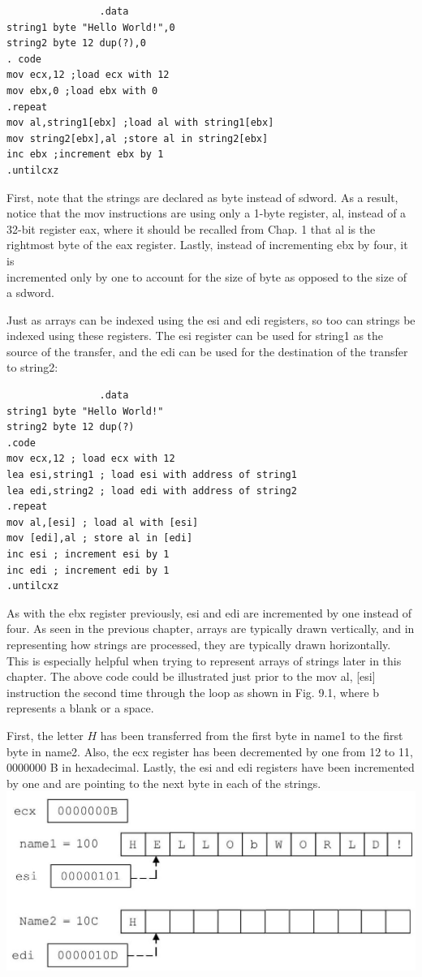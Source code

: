 \documentclass[10pt]{article}
\begin{document}
\begin{verbatim}
                .data
string1 byte "Hello World!",0
string2 byte 12 dup(?),0
. code
mov ecx,12 ;load ecx with 12
mov ebx,0 ;load ebx with 0
.repeat
mov al,string1[ebx] ;load al with string1[ebx]
mov string2[ebx],al ;store al in string2[ebx]
inc ebx ;increment ebx by 1
.untilcxz
\end{verbatim}

First, note that the strings are declared as byte instead of sdword. As a result, notice that the mov instructions are using only a 1-byte register, al, instead of a 32-bit register eax, where it should be recalled from Chap. 1 that al is the rightmost byte of the eax register. Lastly, instead of incrementing ebx by four, it is\\
incremented only by one to account for the size of byte as opposed to the size of a sdword.

Just as arrays can be indexed using the esi and edi registers, so too can strings be indexed using these registers. The esi register can be used for string1 as the source of the transfer, and the edi can be used for the destination of the transfer to string2:

\begin{verbatim}
                .data
string1 byte "Hello World!"
string2 byte 12 dup(?)
.code
mov ecx,12 ; load ecx with 12
lea esi,string1 ; load esi with address of string1
lea edi,string2 ; load edi with address of string2
.repeat
mov al,[esi] ; load al with [esi]
mov [edi],al ; store al in [edi]
inc esi ; increment esi by 1
inc edi ; increment edi by 1
.untilcxz
\end{verbatim}

As with the ebx register previously, esi and edi are incremented by one instead of four. As seen in the previous chapter, arrays are typically drawn vertically, and in representing how strings are processed, they are typically drawn horizontally. This is especially helpful when trying to represent arrays of strings later in this chapter. The above code could be illustrated just prior to the mov al, [esi] instruction the second time through the loop as shown in Fig. 9.1, where b represents a blank or a space.

First, the letter $H$ has been transferred from the first byte in name1 to the first byte in name2. Also, the ecx register has been decremented by one from 12 to 11, 0000000 B in hexadecimal. Lastly, the esi and edi registers have been incremented by one and are pointing to the next byte in each of the strings.\\
\includegraphics[max width=\textwidth, center]{2025_03_24_ebe50cc223a6fbc49eecg-201}
\end{document}
